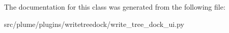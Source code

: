 

The documentation for this class was generated from the following file\+:\begin{DoxyCompactItemize}
\item 
src/plume/plugins/writetreedock/write\+\_\+tree\+\_\+dock\+\_\+ui.\+py\end{DoxyCompactItemize}

